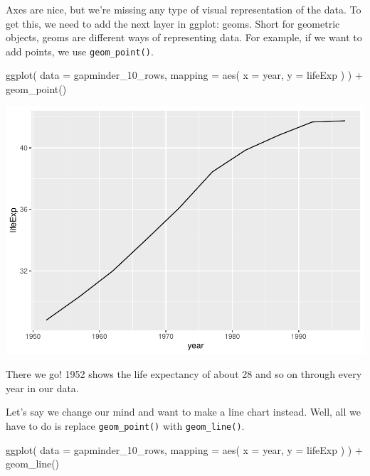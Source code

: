 \documentclass[
]{book}
\newenvironment{Shaded}{\begin{snugshade}}{\end{snugshade}}
\newcommand{\AttributeTok}[1]{\textcolor[rgb]{0.77,0.63,0.00}{#1}}
\newcommand{\FunctionTok}[1]{\textcolor[rgb]{0.00,0.00,0.00}{#1}}
\newcommand{\NormalTok}[1]{#1}
\newcommand{\SpecialCharTok}[1]{\textcolor[rgb]{0.00,0.00,0.00}{#1}}
\begin{document}
Axes are nice, but we're missing any type of visual representation of the data. To get this, we need to add the next layer in ggplot: geoms. Short for geometric objects, geoms are different ways of representing data. For example, if we want to add points, we use \texttt{geom\_point()}.

\begin{Shaded}
\begin{Highlighting}[]
\FunctionTok{ggplot}\NormalTok{(}
  \AttributeTok{data =}\NormalTok{ gapminder\_10\_rows,}
  \AttributeTok{mapping =} \FunctionTok{aes}\NormalTok{(}
    \AttributeTok{x =}\NormalTok{ year,}
    \AttributeTok{y =}\NormalTok{ lifeExp}
\NormalTok{  )}
\NormalTok{) }\SpecialCharTok{+}
  \FunctionTok{geom\_point}\NormalTok{()}
\end{Highlighting}
\end{Shaded}

\includegraphics[width=1\linewidth]{data-viz_files/figure-latex/unnamed-chunk-12-1}

There we go! 1952 shows the life expectancy of about 28 and so on through every year in our data.

Let's say we change our mind and want to make a line chart instead. Well, all we have to do is replace \texttt{geom\_point()} with \texttt{geom\_line()}.

\begin{Shaded}
\begin{Highlighting}[]
\FunctionTok{ggplot}\NormalTok{(}
  \AttributeTok{data =}\NormalTok{ gapminder\_10\_rows,}
  \AttributeTok{mapping =} \FunctionTok{aes}\NormalTok{(}
    \AttributeTok{x =}\NormalTok{ year,}
    \AttributeTok{y =}\NormalTok{ lifeExp}
\NormalTok{  )}
\NormalTok{) }\SpecialCharTok{+}
  \FunctionTok{geom\_line}\NormalTok{()}
\end{Highlighting}
\end{Shaded}
\end{document}
